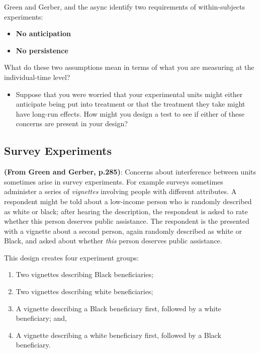 \documentclass[
]{book}
\providecommand{\tightlist}{%
  \setlength{\itemsep}{0pt}\setlength{\parskip}{0pt}}
\begin{document}
Green and Gerber, and the async identify two requirements of
within-subjects experiments:

\begin{itemize}
\tightlist
\item
  \textbf{No anticipation}
\item
  \textbf{No persistence}
\end{itemize}

What do these two assumptions mean in terms of what you are measuring at
the individual-time level?

\begin{itemize}
\tightlist
\item
  Suppose that you were worried that your experimental units might
  either anticipate being put into treatment or that the treatment they
  take might have long-run effects. How might you design a test to see
  if either of these concerns are present in your design?
\end{itemize}

\hypertarget{survey-experiments}{%
\subsection{Survey Experiments}\label{survey-experiments}}

\textbf{(From Green and Gerber, p.285)}: Concerns about interference
between units sometimes arise in survey experiments. For example surveys
sometimes administer a series of \emph{vignettes} involving people with
different attributes. A respondent might be told about a low-income
person who is randomly described as white or black; after hearing the
description, the respondent is asked to rate whether this person
deserves public assistance. The respondent is the presented with a
vignette about a second person, again randomly described as white or
Black, and asked about whether \emph{this} person deserves public
assistance.

This design creates four experiment groups:

\begin{enumerate}
\def\labelenumi{\arabic{enumi}.}
\tightlist
\item
  Two vignettes describing Black beneficiaries;
\item
  Two vignettes describing white beneficiaries;
\item
  A vignette describing a Black beneficiary first, followed by a white
  beneficiary; and,
\item
  A vignette describing a white beneficiary first, followed by a Black
  beneficiary.
\end{enumerate}
\end{document}
